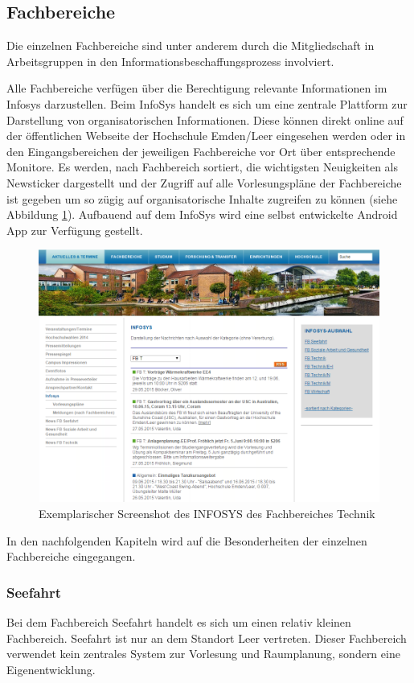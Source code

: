 \subsection{Fachbereiche}
Die einzelnen Fachbereiche sind unter anderem durch die Mitgliedschaft in Arbeitsgruppen in den Informationsbeschaffungsprozess involviert.

Alle Fachbereiche verfügen über die Berechtigung relevante Informationen im Infosys darzustellen. Beim InfoSys handelt es sich um eine zentrale Plattform zur Darstellung von organisatorischen Informationen. Diese können direkt online auf der öffentlichen Webseite der Hochschule Emden/Leer eingesehen werden oder in den Eingangsbereichen der jeweiligen Fachbereiche vor Ort über entsprechende Monitore. Es werden, nach Fachbereich sortiert, die wichtigsten Neuigkeiten als Newsticker dargestellt und der Zugriff auf alle Vorlesungspläne der Fachbereiche ist gegeben um so zügig auf organisatorische Inhalte zugreifen zu können (siehe Abbildung \ref{fig_InfoSys}). Aufbauend auf dem InfoSys wird eine selbst entwickelte Android App zur Verfügung gestellt.

\begin{figure}[h!]
	\centering
	\includegraphics[width=14cm]{kapitel/gruppe2/bilder/InfoSys}
	\caption{Exemplarischer Screenshot des INFOSYS des Fachbereiches Technik}
	\label{fig_InfoSys}
\end{figure}

In den nachfolgenden Kapiteln wird auf die Besonderheiten der einzelnen Fachbereiche eingegangen.

\subsubsection{Seefahrt}
Bei dem Fachbereich Seefahrt handelt es sich um einen relativ kleinen Fachbereich. Seefahrt ist  nur an dem Standort Leer vertreten. Dieser Fachbereich verwendet kein zentrales System zur Vorlesung und Raumplanung, sondern eine Eigenentwicklung.

